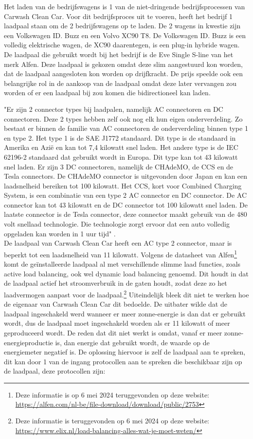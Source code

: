 Het laden van de bedrijfswagens is 1 van de niet-dringende bedrijfsprocessen van Carwash Clean Car. Voor dit bedrijfsproces uit te voeren, heeft het bedrijf 1 laadpaal staan om de 2 bedrijfswagens op te laden. De 2 wagens in kwestie zijn een Volkswagen ID. Buzz en een Volvo XC90 T8. De Volkswagen ID. Buzz is een volledig elektrische wagen, de XC90 daarentegen, is een plug-in hybride wagen. De laadpaal die gebruikt wordt bij het bedrijf is de Eve Single S-line van het merk Alfen. Deze laadpaal is gekozen omdat deze slim aangestuurd kon worden, dat de laadpaal aangesloten kon worden op drijfkracht. De prijs speelde ook een belangrijke rol in de aankoop van de laadpaal omdat deze later vervangen zou worden of er een laadpaal bij zou komen die bidirectioneel kan laden.

\pagebreak

"Er zijn 2 connector types bij laadpalen, namelijk AC connectoren en DC connectoren. Deze 2 types hebben zelf ook nog elk hun eigen onderverdeling. Zo bestaat er binnen de familie van AC connectoren de onderverdeling binnen type 1 en type 2. Het type 1 is de SAE J1772 standaard. Dit type is de standaard in Amerika en Azië en kan tot 7,4 kilowatt snel laden. Het andere type is de IEC 62196-2 standaard dat gebruikt wordt in Europa. Dit type kan tot 43 kilowatt snel laden. Er zijn 3 DC connectoren, namelijk de CHAdeMO, de CCS en de Tesla connectors. De CHAdeMO connector is uitgevonden door Japan en kan een laadsnelheid bereiken tot 100 kilowatt. Het CCS, kort voor Combined Charging System, is een combinatie van een type 2 AC connector en DC connector. De AC connector kan tot 43 kilowatt en de DC connector tot 100 kilowatt snel laden. De laatste connector is de Tesla connector, deze connector maakt gebruik van de 480 volt snellaad technologie. Die technologie zorgt ervoor dat een auto volledig opgeladen kan worden in 1 uur tijd" \autocite{HEMAVATHI2022}. \\

De laadpaal van Carwash Clean Car heeft een AC type 2 connector, maar is beperkt tot een laadsnelheid van 11 kilowatt. Volgens de datasheet van Alfen\footnote{Deze informatie is op 6 mei 2024 teruggevonden op deze website: \url{https://alfen.com/nl-be/file-download/download/public/2753}} komt de geïnstalleerde laadpaal al met verschillende slimme laad functies, zoals active load balancing, ook wel dynamic load balancing genoemd. Dit houdt in dat de laadpaal actief het stroomverbruik in de gaten houdt, zodat deze zo het laadvermogen aanpast voor de laadpaal.\footnote{Deze informatie is teruggevonden op 6 mei 2024 op deze website: \url{https://www.elix.nl/load-balancing-alles-wat-je-moet-weten/}} Uiteindelijk bleek dit niet te werken hoe de eigenaar van Carwash Clean Car dit bedoelde. De uitbater wilde dat de laadpaal ingeschakeld werd wanneer er meer zonne-energie is dan dat er gebruikt wordt, dus de laadpaal moet ingeschakeld worden als er 11 kilowatt of meer geproduceerd wordt. De reden dat dit niet werkt is omdat, vanaf er meer zonne-energieproductie is, dan energie dat gebruikt wordt, de waarde op de energiemeter negatief is. De oplossing hiervoor is zelf de laadpaal aan te spreken, dit kan door 1 van de ingang protocollen aan te spreken die beschikbaar zijn op de laadpaal, deze protocollen zijn:

